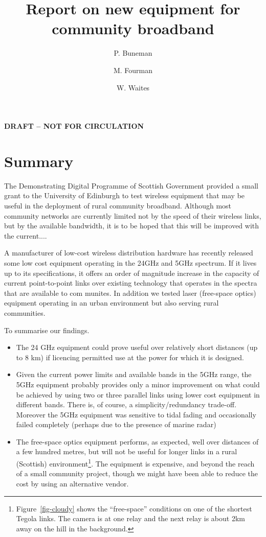 \documentclass{amsart}
\title{Report on new equipment for community broadband}
\author{P. Buneman \and M. Fourman \and W. Waites}
\begin{document}
\begin{center}
  {\Huge\textbf{\color{red}DRAFT -- NOT FOR CIRCULATION}}
\end{center}
\maketitle
\tableofcontents
\section{Summary}
The Demonstrating Digital Programme of Scottish Government provided a small grant to the
University of Edinburgh to test wireless equipment that may be useful in the
deployment of rural community broadband.  Although most community
networks are currently limited not by the speed of their wireless
links, but by the available bandwidth, it is to be hoped that this
will be improved with the current....

A manufacturer of low-cost wireless distribution hardware has recently
released some low cost equipment operating in the 24GHz and 5GHz
spectrum.  If it lives up to its specifications, it offers an order of
magnitude increase in the capacity of current point-to-point links
over existing technology that operates in the spectra that are
available to com
munites.  In addition we tested laser (free-space
optics) equipment operating in an urban environment but also serving
rural communities.

To summarise our findings.
\begin{itemize}
\item The 24 GHz equipment could prove useful over relatively short
distances (up to 8 km) if licencing permitted use at the power for
which it is designed.

\item Given the current power limits and available bands in the 
5GHz range, the 5GHz equipment probably provides only a minor
improvement on what could be achieved by using two or three parallel
links using lower cost equipment in different bands.  There is, of
course, a simplicity/redundancy trade-off. Moreover the 5GHz equipment
was sensitive to tidal fading and occasionally failed completely (perhaps
due to the presence of marine radar)

\item The free-space optics equipment performs, as expected, well over
  distances of a few hundred metres, but will not be useful for longer
  links in a rural (Scottish)
  environment\footnote{Figure~\ref{fig-cloudy} shows the ``free-space''
    conditions on one of the shortest Tegola links.  The camera is at one relay
    and the next relay is about 2km away on the hill in the
    background.}. The equipment is expensive, and beyond the reach of
  a small community project, though we might have   been able to
  reduce the cost by using an alternative vendor.
\end{itemize}
\end{document}
